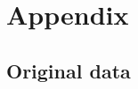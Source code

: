 \section{Appendix}
\label{sec:Anhang}
\subsection{Original data}
\centering

\begin{figure}
    \centering
    
\end{figure}

\newpage

\begin{figure}
    \centering
    
\end{figure}
